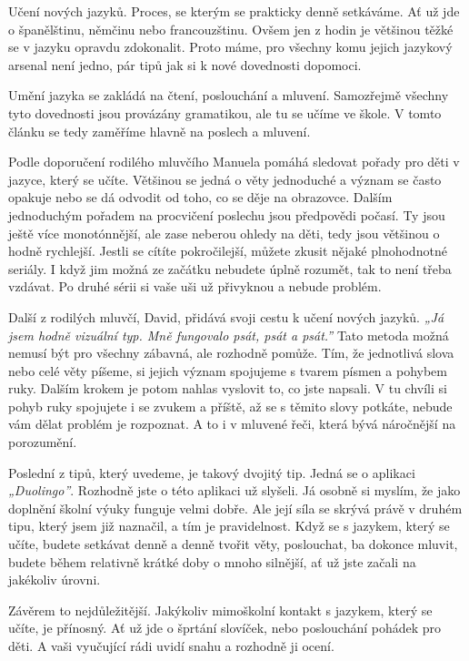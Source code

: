 \documentclass[12pt, a4paper]{article}
\begin{document}
\begin{multicols*}{2}
		Učení nových jazyků. Proces, se kterým se prakticky denně setkáváme. Ať už jde o španělštinu, němčinu nebo francouzštinu. Ovšem jen z hodin je většinou těžké se v jazyku opravdu zdokonalit. Proto máme, pro všechny komu jejich jazykový arsenal není jedno, pár tipů jak si k nové dovednosti dopomoci. \par
		Umění jazyka se zakládá na čtení, poslouchání a mluvení. Samozřejmě všechny tyto dovednosti jsou provázány gramatikou, ale tu se učíme ve škole. V tomto článku se tedy zaměříme hlavně na poslech a mluvení. \par
		Podle doporučení rodilého mluvčího Manuela pomáhá sledovat pořady pro děti v jazyce, který se učíte. Většinou se jedná o věty jednoduché a význam se často opakuje nebo se dá odvodit od toho, co se děje na obrazovce. Dalším jednoduchým pořadem na procvičení poslechu jsou předpovědi počasí. Ty jsou ještě více monotónnější, ale zase neberou ohledy na děti, tedy jsou většinou o hodně rychlejší. Jestli se cítíte pokročilejší, můžete zkusit nějaké plnohodnotné seriály. I když jim možná ze začátku nebudete úplně rozumět, tak to není třeba vzdávat. Po druhé sérii si vaše uši už přivyknou a nebude problém. \par
		Další  z rodilých mluvčí, David, přidává svoji cestu k učení nových jazyků. \emph{„Já jsem hodně vizuální typ. Mně fungovalo psát, psát a psát.”} Tato metoda možná nemusí být pro všechny zábavná, ale rozhodně pomůže. Tím, že jednotlivá slova nebo celé věty píšeme, si jejich význam spojujeme s tvarem písmen a pohybem ruky. Dalším krokem je potom nahlas vyslovit to, co jste napsali. V tu chvíli si pohyb ruky spojujete i se zvukem a příště, až se s těmito slovy potkáte, nebude vám dělat problém je rozpoznat. A to i v mluvené řeči, která bývá náročnější na porozumění. \par
		Poslední z tipů, který uvedeme, je takový dvojitý tip. Jedná se o aplikaci \emph{„Duolingo”}. Rozhodně jste o této aplikaci už slyšeli. Já osobně si myslím, že jako doplnění školní výuky funguje velmi dobře. Ale její síla se skrývá právě v druhém tipu, který jsem již naznačil, a tím je pravidelnost. Když se s jazykem, který se učíte, budete setkávat denně a denně tvořit věty, poslouchat, ba dokonce mluvit, budete během relativně krátké doby o mnoho silnější, ať už jste začali na jakékoliv úrovni. \par
		Závěrem to nejdůležitější. Jakýkoliv mimoškolní kontakt s jazykem, který se učíte, je přínosný. Ať už jde o šprtání slovíček, nebo poslouchání pohádek pro děti. A vaši vyučující rádi uvidí snahu a rozhodně ji ocení. 

\end{multicols*}
\end{document}
